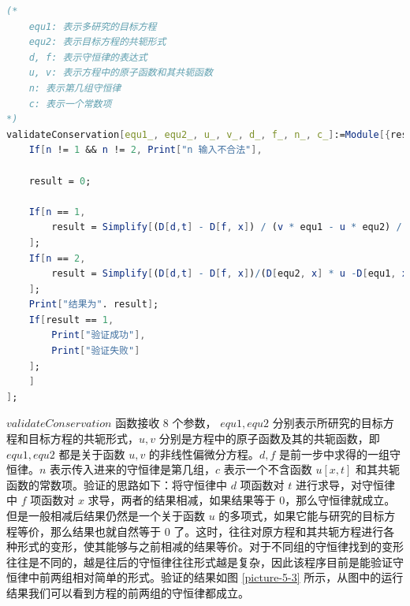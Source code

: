 \begin{lstlisting}[language=Mathematica,caption=验证守恒律]
(*
	equ1: 表示多研究的目标方程
	equ2: 表示目标方程的共轭形式
	d, f: 表示守恒律的表达式
	u, v: 表示方程中的原子函数和其共轭函数
	n: 表示第几组守恒律
	c: 表示一个常数项
*)
validateConservation[equ1_, equ2_, u_, v_, d_, f_, n_, c_]:=Module[{result},
	If[n != 1 && n != 2, Print["n 输入不合法"],
	
	result = 0;

	If[n == 1,
		result = Simplify[(D[d,t] - D[f, x]) / (v * equ1 - u * equ2) / c];
	];
	If[n == 2,
		result = Simplify[(D[d,t] - D[f, x])/(D[equ2, x] * u -D[equ1, x] * v + D[v, x] * equ1 + D[u, x] * equ2) / c];
	];
	Print["结果为". result];
	If[result == 1,
		Print["验证成功"],
		Print["验证失败"]
	];
	]
];
\end{lstlisting}
$validateConservation$ 函数接收 8 个参数， $equ1, equ2$ 分别表示所研究的目标方程和目标方程的共轭形式，$u, v$ 分别是方程中的原子函数及其的共轭函数，即 $equ1, equ2$ 都是关于函数 $u, v$ 的非线性偏微分方程。$d, f$ 是前一步中求得的一组守恒律。$n$ 表示传入进来的守恒律是第几组，$c$ 表示一个不含函数 $u[x,t]$ 和其共轭函数的常数项。验证的思路如下：将守恒律中 $d$ 项函数对 $t$ 进行求导，对守恒律中 $f$ 项函数对 $x$ 求导，两者的结果相减，如果结果等于 0，那么守恒律就成立。但是一般相减后结果仍然是一个关于函数 $u$ 的多项式，如果它能与研究的目标方程等价，那么结果也就自然等于 0 了。这时，往往对原方程和其共轭方程进行各种形式的变形，使其能够与之前相减的结果等价。对于不同组的守恒律找到的变形往往是不同的，越是往后的守恒律往往形式越是复杂，因此该程序目前是能验证守恒律中前两组相对简单的形式。验证的结果如图  \ref{picture-5-3} 所示，从图中的运行结果我们可以看到方程的前两组的守恒律都成立。

